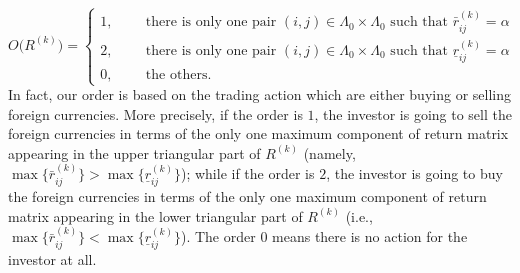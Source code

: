 \documentclass[11pt]{article}
\numberwithin{equation}{section}
\begin{document}
\begin{equation}\label{order}
O\Big(R^{(k)}\Big) =
\begin{cases}
1,  ~~~~~~~~~\mbox{ there is only one pair  } (i,j)\in \Lambda_0\times\Lambda_0 \mbox{ such that } \bar r_{ij}^{(k)}=\alpha\\
2,  ~~~~~~~~~\mbox{ there is only one pair  } (i,j)\in \Lambda_0\times\Lambda_0 \mbox{ such that } \underline r_{ij}^{(k)}=\alpha\\
0,  ~~~~~~~~~\mbox{ the others}.
\end{cases}\end{equation}
In fact, our order is based on the trading action which are either buying or selling foreign currencies. More precisely, if the order is $1$, the investor is going to sell the foreign currencies 
in terms of  the only one maximum component of return matrix appearing in the upper triangular part of $R^{(k)}$ (namely, $\max\{\bar r^{(k)}_{ij}\}>\max\{\underline r^{(k)}_{ij}\}$); while if the order 
is $2$, the investor is going to buy the foreign currencies in terms of the only one maximum component of return matrix appearing in the lower triangular part of  $R^{(k)}$  
(i.e., $\max\{\bar r^{(k)}_{ij}\}<\max\{\underline r^{(k)}_{ij}\}$). The order $0$ means there is no action for the investor at all. 
\end{document}
